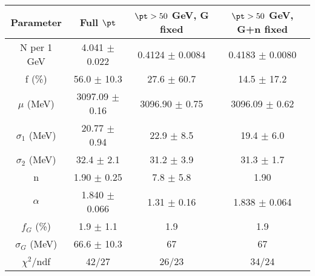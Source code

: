 \begin{tabular}{c||c|c|c}
Parameter & Full $\pt$ & $\pt>50$ GeV, G fixed & $\pt>50$ GeV, G+n fixed \\
\hline
N per 1 GeV & 4.041 $\pm$ 0.022 & 0.4124 $\pm$ 0.0084 & 0.4183 $\pm$ 0.0080\\
f (\%) & 56.0 $\pm$ 10.3 & 27.6 $\pm$ 60.7 & 14.5 $\pm$ 17.2\\
$\mu$ (MeV) & 3097.09 $\pm$ 0.16 & 3096.90 $\pm$ 0.75 & 3096.09 $\pm$ 0.62\\
$\sigma_1$ (MeV) & 20.77 $\pm$ 0.94 & 22.9 $\pm$ 8.5 & 19.4 $\pm$ 6.0\\
$\sigma_2$ (MeV) & 32.4 $\pm$ 2.1 & 31.2 $\pm$ 3.9 & 31.3 $\pm$ 1.7\\
n & 1.90 $\pm$ 0.25 & 7.8 $\pm$ 5.8 & 1.90\\
$\alpha$ & 1.840 $\pm$ 0.066 & 1.31 $\pm$ 0.16 & 1.838 $\pm$ 0.064\\
$f_G$ (\%) & 1.9 $\pm$ 1.1 & 1.9 & 1.9\\
$\sigma_G$ (MeV) & 66.6 $\pm$ 10.3 & 67 & 67\\
\hline
$\chi^2$/ndf & 42/27 & 26/23 & 34/24\\
\end{tabular}
